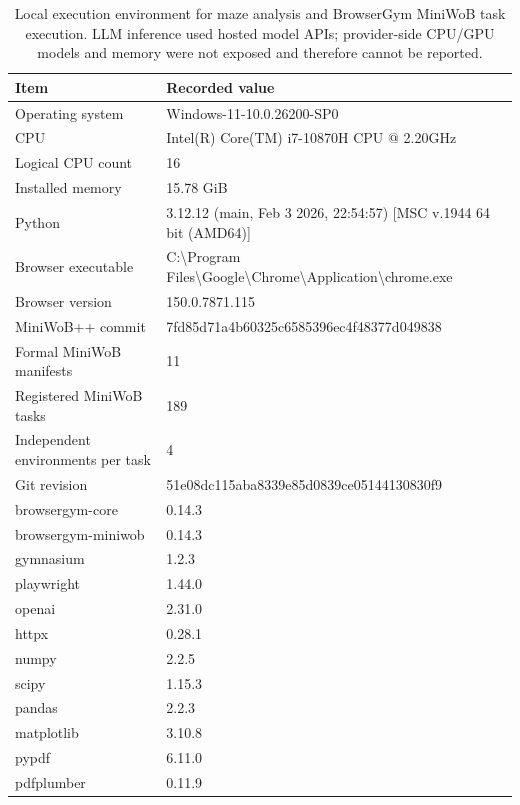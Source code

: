 \begin{table}[t]
\centering
\scriptsize
\setlength{\tabcolsep}{5pt}
\caption{Local execution environment for maze analysis and BrowserGym MiniWoB task execution. LLM inference used hosted model APIs; provider-side CPU/GPU models and memory were not exposed and therefore cannot be reported.}
\label{tab:execution-environment}
\begin{tabular}{@{}p{}p{}@{}}
\toprule
Item & Recorded value \\
\midrule
Operating system & Windows-11-10.0.26200-SP0 \\
CPU & Intel(R) Core(TM) i7-10870H CPU @ 2.20GHz \\
Logical CPU count & 16 \\
Installed memory & 15.78 GiB \\
Python & 3.12.12 (main, Feb  3 2026, 22:54:57) [MSC v.1944 64 bit (AMD64)] \\
Browser executable & C:\textbackslash{}Program Files\textbackslash{}Google\textbackslash{}Chrome\textbackslash{}Application\textbackslash{}chrome.exe \\
Browser version & 150.0.7871.115 \\
MiniWoB++ commit & 7fd85d71a4b60325c6585396ec4f48377d049838 \\
Formal MiniWoB manifests & 11 \\
Registered MiniWoB tasks & 189 \\
Independent environments per task & 4 \\
Git revision & 51e08dc115aba8339e85d0839ce05144130830f9 \\
browsergym-core & 0.14.3 \\
browsergym-miniwob & 0.14.3 \\
gymnasium & 1.2.3 \\
playwright & 1.44.0 \\
openai & 2.31.0 \\
httpx & 0.28.1 \\
numpy & 2.2.5 \\
scipy & 1.15.3 \\
pandas & 2.2.3 \\
matplotlib & 3.10.8 \\
pypdf & 6.11.0 \\
pdfplumber & 0.11.9 \\
\bottomrule
\end{tabular}
\end{table}
